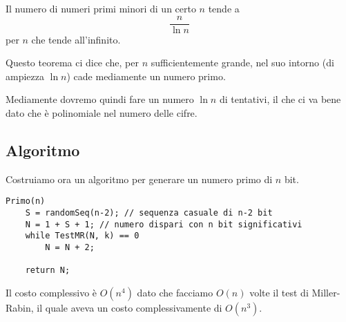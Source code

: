 \begin{theorem}
	Il numero di numeri primi minori di un certo $n$ tende a
	\[ \frac{n}{\ln n} \]
	per $n$ che tende all'infinito.
\end{theorem}

Questo teorema ci dice che, per $n$ sufficientemente grande, nel suo intorno (di ampiezza $\ln n$) cade mediamente un
numero primo.

Mediamente dovremo quindi fare un numero $\ln n$ di tentativi, il che ci va bene dato che \`e polinomiale nel numero
delle cifre.

\subsection{Algoritmo}
Costruiamo ora un algoritmo per generare un numero primo di $n$ bit.

\begin{lstlisting}[style=pseudo-style]
Primo(n)
	S = randomSeq(n-2); // sequenza casuale di n-2 bit
	N = 1 + S + 1; // numero dispari con n bit significativi
	while TestMR(N, k) == 0 
		N = N + 2;

	return N;
\end{lstlisting}
Il costo complessivo \`e $O(n^4)$ dato che facciamo $O(n)$ volte il test di Miller-Rabin, il quale aveva un costo
complessivamente di $O(n^3)$.
